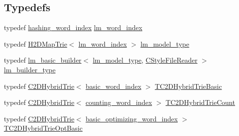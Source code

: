 \subsection*{Typedefs}
\begin{DoxyCompactItemize}
\item 
typedef \hyperlink{classuva_1_1smt_1_1bpbd_1_1server_1_1lm_1_1dictionary_1_1hashing__word__index}{hashing\+\_\+word\+\_\+index} \hyperlink{namespaceuva_1_1smt_1_1bpbd_1_1server_1_1lm_a023e38a6fe02511f8c3c806784c2a5f2}{lm\+\_\+word\+\_\+index}
\item 
typedef \hyperlink{classuva_1_1smt_1_1bpbd_1_1server_1_1lm_1_1_h2_d_map_trie}{H2\+D\+Map\+Trie}$<$ \hyperlink{namespaceuva_1_1smt_1_1bpbd_1_1server_1_1lm_a023e38a6fe02511f8c3c806784c2a5f2}{lm\+\_\+word\+\_\+index} $>$ \hyperlink{namespaceuva_1_1smt_1_1bpbd_1_1server_1_1lm_a1d312807a76856e10bfbed1cae210b0d}{lm\+\_\+model\+\_\+type}
\item 
typedef \hyperlink{classuva_1_1smt_1_1bpbd_1_1server_1_1lm_1_1arpa_1_1lm__basic__builder}{lm\+\_\+basic\+\_\+builder}$<$ \hyperlink{namespaceuva_1_1smt_1_1bpbd_1_1server_1_1lm_a1d312807a76856e10bfbed1cae210b0d}{lm\+\_\+model\+\_\+type}, \hyperlink{classuva_1_1utils_1_1file_1_1_c_style_file_reader}{C\+Style\+File\+Reader} $>$ \hyperlink{namespaceuva_1_1smt_1_1bpbd_1_1server_1_1lm_ace2f660bee1117b5b98b58eb5c8e853a}{lm\+\_\+builder\+\_\+type}
\item 
typedef \hyperlink{classuva_1_1smt_1_1bpbd_1_1server_1_1lm_1_1_c2_d_hybrid_trie}{C2\+D\+Hybrid\+Trie}$<$ \hyperlink{classuva_1_1smt_1_1bpbd_1_1server_1_1lm_1_1dictionary_1_1basic__word__index}{basic\+\_\+word\+\_\+index} $>$ \hyperlink{namespaceuva_1_1smt_1_1bpbd_1_1server_1_1lm_a96890f7df15f6df7def061b4cebb16bb}{T\+C2\+D\+Hybrid\+Trie\+Basic}
\item 
typedef \hyperlink{classuva_1_1smt_1_1bpbd_1_1server_1_1lm_1_1_c2_d_hybrid_trie}{C2\+D\+Hybrid\+Trie}$<$ \hyperlink{classuva_1_1smt_1_1bpbd_1_1server_1_1lm_1_1dictionary_1_1counting__word__index}{counting\+\_\+word\+\_\+index} $>$ \hyperlink{namespaceuva_1_1smt_1_1bpbd_1_1server_1_1lm_a8e12ef7ca924b2c5fd7f20236fe08dc5}{T\+C2\+D\+Hybrid\+Trie\+Count}
\item 
typedef \hyperlink{classuva_1_1smt_1_1bpbd_1_1server_1_1lm_1_1_c2_d_hybrid_trie}{C2\+D\+Hybrid\+Trie}$<$ \hyperlink{namespaceuva_1_1smt_1_1bpbd_1_1server_1_1lm_1_1dictionary_a3001583c904eec702b4a4125082a7ecd}{basic\+\_\+optimizing\+\_\+word\+\_\+index} $>$ \hyperlink{namespaceuva_1_1smt_1_1bpbd_1_1server_1_1lm_a3f81cdde0dc5ee7b07e41261e55d72de}{T\+C2\+D\+Hybrid\+Trie\+Opt\+Basic}

\end{DoxyCompactItemize}
